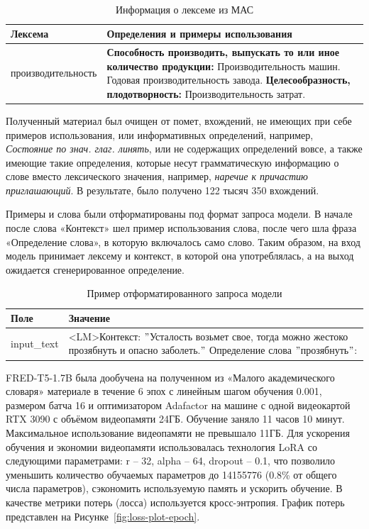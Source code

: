 \documentclass[LI,VKR]{HSEUniversity}
\begin{document}
\begin{table}[H]
\centering
\caption{Информация о лексеме из МАС} \\
\label{tab:Пример МАС}
\begin{tabular}{|m{4.5cm}|m{9.5cm}|}
\hline
\textbf{Лексема} & \textbf{Определения и примеры использования} \\
\hline
производительность & \textbf{Способность производить, выпускать то или иное количество продукции:} Производительность машин. Годовая производительность завода.
\newline \textbf{Целесообразность, плодотворность:} Производительность затрат. \\
\hline
\end{tabular}
\end{table}

Полученный материал был очищен от помет, вхождений, не имеющих при себе примеров использования,
или информативных определений, например, \textit{Состояние по знач. глаг. линять},
или не содержащих определений вовсе, а также имеющие такие определения,
которые несут грамматическую информацию о слове вместо лексического значения,
например, \textit{наречие к причастию приглашающий}.
В результате, было получено 122 тысяч 350 вхождений.

Примеры и слова были отформатированы под формат запроса модели.
В начале после слова «Контекст» шел пример использования слова, после чего шла фраза
«Определение слова», в которую включалось само слово.
Таким образом, на вход модель
принимает лексему и контекст, в которой она употреблялась, а на выход ожидается сгенерированное
определение.

\begin{table}[H]
\centering
\caption{Пример отформатированного запроса модели}
\begin{tabular}{|m{2.5cm}|m{9.5cm}|}
\hline
\textbf{Поле}       & \textbf{Значение}                                                                                          \\
\hline
input\_text  & <LM>Контекст: \("\)Усталость возьмет свое, тогда можно жестоко прозябнуть и опасно заболеть.\("\) Определение слова \("\)прозябнуть\("\): \\
\hline
\end{tabular}
\end{table}

FRED-T5-1.7B была дообучена на полученном из «Малого академического словаря» материале
в течение 6 эпох с линейным шагом обучения 0.001,
размером батча 16 и оптимизатором Adafactor на машине с одной видеокартой RTX 3090
с объёмом видеопамяти 24ГБ.
Обучение заняло 11 часов 10 минут. %
Максимальное использование видеопамяти не превышало 11ГБ. %
Для ускорения обучения и экономии видеопамяти использовалась технология LoRA со
следующими параметрами: r – 32, alpha
 – 64, dropout – 0.1, что позволило
уменьшить количество обучаемых параметров до 14155776 (0.8\% от общего числа параметров),
сэкономить используемую память и ускорить обучение.
В качестве метрики потерь (лосса) используется кросс-энтропия.
График потерь представлен на Рисунке~\ref{fig:loss-plot-epoch}.
\end{document}
